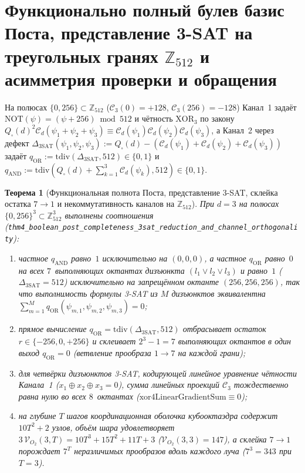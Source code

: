 \documentclass[11pt,a4paper]{article}
\theoremstyle{plain}
\newtheorem{theorem}{Теорема}[section]
\theoremstyle{definition}
\begin{document}
\section{Функционально полный булев базис Поста, представление 3-SAT на треугольных гранях \texorpdfstring{$\mathbb{Z}_{512}$}{Z512} и асимметрия проверки и обращения}
\label{sec:boolean-3sat}

На полюсах $\{0,256\}\subset\mathbb{Z}_{512}$ ($\mathcal{C}_3(0)=+128$, $\mathcal{C}_3(256)=-128$) Канал~1 задаёт $\mathrm{NOT}(\psi)=(\psi+256)\bmod 512$ и чётность $\mathrm{XOR}_3$ по закону $Q_\square(d)^2\mathcal{C}_d(\psi_1+\psi_2+\psi_3)\equiv \mathcal{C}_d(\psi_1)\mathcal{C}_d(\psi_2)\mathcal{C}_d(\psi_3)$, а Канал~2 через дефект $\Delta_{\mathrm{3SAT}}(\psi_1,\psi_2,\psi_3) := Q_\square(d)-(\mathcal{C}_d(\psi_1)+\mathcal{C}_d(\psi_2)+\mathcal{C}_d(\psi_3))$ задаёт $q_{\mathrm{OR}} := \mathrm{tdiv}(\Delta_{\mathrm{3SAT}},512)\in\{0,1\}$ и $q_{\mathrm{AND}} := \mathrm{tdiv}(Q_\square(d)+\sum_{k=1}^3\mathcal{C}_d(\psi_k),512)\in\{0,1\}$.

\begin{theorem}[Функциональная полнота Поста, представление 3-SAT, склейка остатка $7\to 1$ и некоммутативность каналов на $\mathbb{Z}_{512}$]
\label{thm:main-4}
При $d=3$ на полюсах $\{0,256\}^3\subset\mathbb{Z}_{512}^3$ выполнены соотношения (\texttt{thm4\_boolean\_post\_completeness\_3sat\_reduction\_and\_channel\_orthogonality}):
\begin{enumerate}[label=\textbf{(\roman*)},leftmargin=*]
\item частное $q_{\mathrm{AND}}$ равно~$1$ исключительно на $(0,0,0)$, а частное $q_{\mathrm{OR}}$ равно~$0$ на всех $7$~выполняющих октантах дизъюнкта $(l_1\lor l_2\lor l_3)$ и равно~$1$ ($\Delta_{\mathrm{3SAT}}=512$) исключительно на запрещённом октанте $(256,256,256)$, так что выполнимость формулы 3-SAT из $M$ дизъюнктов эквивалентна $\sum_{m=1}^M q_{\mathrm{OR}}(\psi_{m,1},\psi_{m,2},\psi_{m,3}) = 0$;
\item прямое вычисление $q_{\mathrm{OR}}=\mathrm{tdiv}(\Delta_{\mathrm{3SAT}},512)$ отбрасывает остаток $r\in\{-256,0,+256\}$ и склеивает $2^3-1=7$ выполняющих октантов в один выход $q_{\mathrm{OR}}=0$ (ветвление прообраза $1\to 7$ на каждой грани);
\item для четвёрки дизъюнктов 3-SAT, кодирующей линейное уравнение чётности Канала~1 ($x_1\oplus x_2\oplus x_3=0$), сумма линейных проекций $\mathcal{C}_3$ тождественно равна нулю во всех $8$~октантах ($\mathrm{xor4LinearGradientSum}\equiv 0$);
\item на глубине $T$ шагов координационная оболочка кубооктаэдра содержит $10T^2+2$ узлов, объём шара удовлетворяет $3\,\mathcal{V}_{O_2}(3,T)=10T^3+15T^2+11T+3$ ($\mathcal{V}_{O_2}(3,3)=147$), а склейка $7\to 1$ порождает $7^T$ неразличимых прообразов вдоль каждого луча ($7^3=343$ при $T=3$).
\end{enumerate}
\end{theorem}
\end{document}
